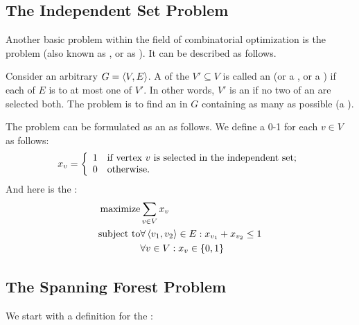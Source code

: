 \subsection{The Independent Set Problem}

Another basic problem within the field of combinatorial optimization is the  problem (also known as , or as ). It can be described as follows.

\begin{definition}
Consider an arbitrary  $G=\left\langle V,E \right\rangle$. A  of the  $V'\subseteq V$ is called an  (or a , or a ) if each  of $E$ is  to at most one  of $V'$. In other words, $V'$ is an  if no two  of an  are selected both. The problem is to find an  in $G$ containing as many  as possible (a ).
\end{definition}

The problem can be formulated as an  as follows. We define a 0-1  for each  $v\in V$ as follows:
\begin{equation}
x_v=\left\{\begin{array}{ll} 1&\mbox{if vertex $v$ is selected in the independent set;}\\0&\mbox{otherwise.} \end{array}\right.
\end{equation}
And here is the :
\begin{eqnarray}
\mbox{maximize}&\sumdomain[v]{V}{x_v}\eqnlab{stableset-m}\\
\mbox{subject to}&\forall\tupl{v_1,v_2}\in E:x_{v_1}+x_{v_2}\leq 1\eqnlab{stableset-c1}\\
&\forall v\in V:x_v\in\accl{0,1}\eqnlab{stableset-c2}
\end{eqnarray}


\subsection{The Spanning Forest Problem}

We start with a definition for the :

